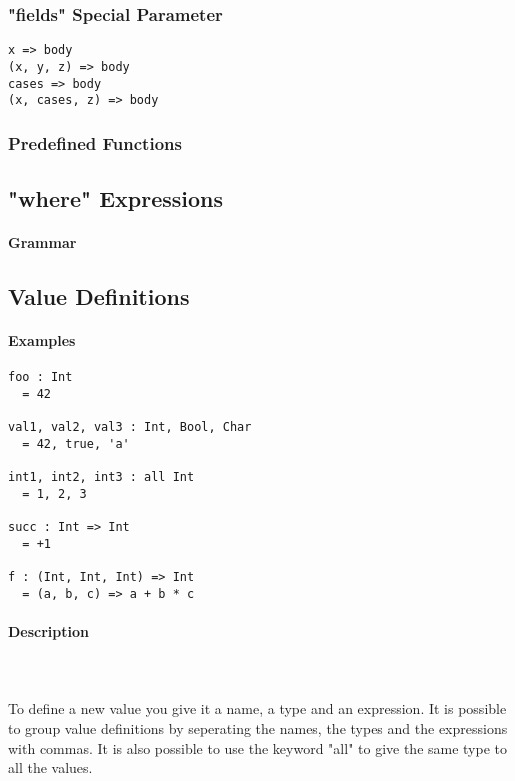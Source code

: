 \documentclass{article}
\def\pend{\mbox{} \\\\}
\begin{document}
\subsubsection{"fields" Special Parameter}

\begin{verbatim}
x => body
(x, y, z) => body
cases => body
(x, cases, z) => body
\end{verbatim}

\subsubsection{Predefined Functions}

\subsection{"where" Expressions}

\paragraph{Grammar}

\subsection{Value Definitions}
\label{subsec:valdefs}

\paragraph{Examples}

\begin{verbatim}
foo : Int
  = 42

val1, val2, val3 : Int, Bool, Char
  = 42, true, 'a'

int1, int2, int3 : all Int
  = 1, 2, 3

succ : Int => Int
  = +1

f : (Int, Int, Int) => Int
  = (a, b, c) => a + b * c
\end{verbatim}

\paragraph{Description}\pend
To define a new value you give it a name, a type and an expression. It is possible
to group value definitions by seperating the names, the types and the expressions
with commas. It is also possible to use the keyword "all" to give the same type
to all the values.
\end{document}
